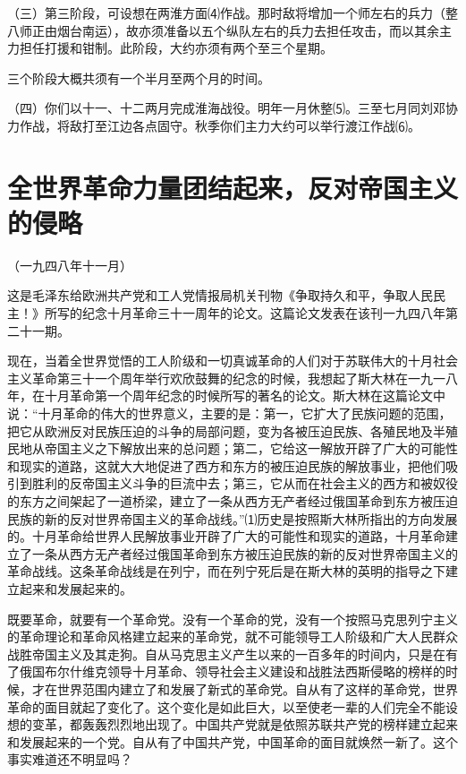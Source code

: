 \documentclass[UTF-8, a5paper, 12pt]{ctexart}
\begin{document}
（三）第三阶段，可设想在两淮方面⑷作战。那时敌将增加一个师左右的兵力（整八师正由烟台南运），故亦须准备以五个纵队左右的兵力去担任攻击，而以其余主力担任打援和钳制。此阶段，大约亦须有两个至三个星期。

三个阶段大概共须有一个半月至两个月的时间。

（四）你们以十一、十二两月完成淮海战役。明年一月休整⑸。三至七月同刘邓协力作战，将敌打至江边各点固守。秋季你们主力大约可以举行渡江作战⑹。

\section{全世界革命力量团结起来，反对帝国主义的侵略}

（一九四八年十一月）

这是毛泽东给欧洲共产党和工人党情报局机关刊物《争取持久和平，争取人民民主！》所写的纪念十月革命三十一周年的论文。这篇论文发表在该刊一九四八年第二十一期。

现在，当着全世界觉悟的工人阶级和一切真诚革命的人们对于苏联伟大的十月社会主义革命第三十一个周年举行欢欣鼓舞的纪念的时候，我想起了斯大林在一九一八年，在十月革命第一个周年纪念的时候所写的著名的论文。斯大林在这篇论文中说：“十月革命的伟大的世界意义，主要的是：第一，它扩大了民族问题的范围，把它从欧洲反对民族压迫的斗争的局部问题，变为各被压迫民族、各殖民地及半殖民地从帝国主义之下解放出来的总问题；第二，它给这一解放开辟了广大的可能性和现实的道路，这就大大地促进了西方和东方的被压迫民族的解放事业，把他们吸引到胜利的反帝国主义斗争的巨流中去；第三，它从而在社会主义的西方和被奴役的东方之间架起了一道桥梁，建立了一条从西方无产者经过俄国革命到东方被压迫民族的新的反对世界帝国主义的革命战线。”⑴历史是按照斯大林所指出的方向发展的。十月革命给世界人民解放事业开辟了广大的可能性和现实的道路，十月革命建立了一条从西方无产者经过俄国革命到东方被压迫民族的新的反对世界帝国主义的革命战线。这条革命战线是在列宁，而在列宁死后是在斯大林的英明的指导之下建立起来和发展起来的。

既要革命，就要有一个革命党。没有一个革命的党，没有一个按照马克思列宁主义的革命理论和革命风格建立起来的革命党，就不可能领导工人阶级和广大人民群众战胜帝国主义及其走狗。自从马克思主义产生以来的一百多年的时间内，只是在有了俄国布尔什维克领导十月革命、领导社会主义建设和战胜法西斯侵略的榜样的时候，才在世界范围内建立了和发展了新式的革命党。自从有了这样的革命党，世界革命的面目就起了变化了。这个变化是如此巨大，以至使老一辈的人们完全不能设想的变革，都轰轰烈烈地出现了。中国共产党就是依照苏联共产党的榜样建立起来和发展起来的一个党。自从有了中国共产党，中国革命的面目就焕然一新了。这个事实难道还不明显吗？
\end{document}
